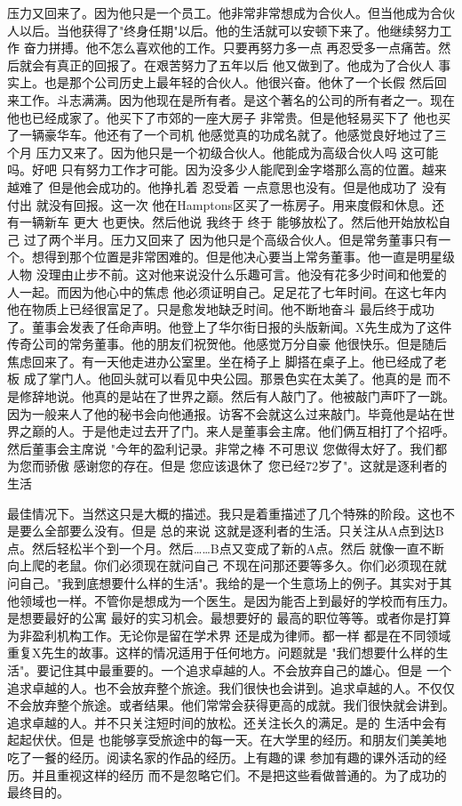 压力又回来了。因为他只是一个员工。他非常非常想成为合伙人。但当他成为合伙人以后。当他获得了"终身任期"以后。他的生活就可以安顿下来了。他继续努力工作 奋力拼搏。他不怎么喜欢他的工作。只要再努力多一点 再忍受多一点痛苦。然后就会有真正的回报了。在艰苦努力了五年以后 他又做到了。他成为了合伙人 事实上。也是那个公司历史上最年轻的合伙人。他很兴奋。他休了一个长假 然后回来工作。斗志满满。因为他现在是所有者。是这个著名的公司的所有者之一。现在他也已经成家了。他买下了市郊的一座大房子 非常贵。但是他轻易买下了 他也买了一辆豪华车。他还有了一个司机 他感觉真的功成名就了。他感觉良好地过了三个月 压力又来了。因为他只是一个初级合伙人。他能成为高级合伙人吗 这可能吗。好吧 只有努力工作才可能。因为没多少人能爬到金字塔那么高的位置。越来越难了 但是他会成功的。他挣扎着 忍受着 一点意思也没有。但是他成功了 没有付出 就没有回报。这一次 他在Hamptons区买了一栋房子。用来度假和休息。还有一辆新车 更大 也更快。然后他说 我终于 终于 能够放松了。然后他开始放松自己 过了两个半月。压力又回来了 因为他只是个高级合伙人。但是常务董事只有一个。想得到那个位置是非常困难的。但是他决心要当上常务董事。他一直是明星级人物 没理由止步不前。这对他来说没什么乐趣可言。他没有花多少时间和他爱的人一起。而因为他心中的焦虑 他必须证明自己。足足花了七年时间。在这七年内 他在物质上已经很富足了。只是愈发地缺乏时间。他不断地奋斗 最后终于成功了。董事会发表了任命声明。他登上了华尔街日报的头版新闻。X先生成为了这件传奇公司的常务董事。他的朋友们祝贺他。他感觉万分自豪 他很快乐。但是随后焦虑回来了。有一天他走进办公室里。坐在椅子上 脚搭在桌子上。他已经成了老板 成了掌门人。他回头就可以看见中央公园。那景色实在太美了。他真的是 而不是修辞地说。他真的是站在了世界之巅。然后有人敲门了。他被敲门声吓了一跳。因为一般来人了他的秘书会向他通报。访客不会就这么过来敲门。毕竟他是站在世界之巅的人。于是他走过去开了门。来人是董事会主席。他们俩互相打了个招呼。然后董事会主席说 "今年的盈利记录。非常之棒 不可思议 您做得太好了。我们都为您而骄傲 感谢您的存在。但是 您应该退休了 您已经72岁了"。这就是逐利者的生活 

最佳情况下。当然这只是大概的描述。我只是着重描述了几个特殊的阶段。这也不是要么全部要么没有。但是 总的来说 这就是逐利者的生活。只关注从A点到达B点。然后轻松半个到一个月。然后……B点又变成了新的A点。然后 就像一直不断向上爬的老鼠。你们必须现在就问自己 不现在问那还要等多久。你们必须现在就问自己。"我到底想要什么样的生活"。我给的是一个生意场上的例子。其实对于其他领域也一样。不管你是想成为一个医生。是因为能否上到最好的学校而有压力。是想要最好的公寓 最好的实习机会。最想要好的 最高的职位等等。或者你是打算为非盈利机构工作。无论你是留在学术界 还是成为律师。都一样 都是在不同领域重复X先生的故事。这样的情况适用于任何地方。问题就是 "我们想要什么样的生活"。要记住其中最重要的。一个追求卓越的人。不会放弃自己的雄心。但是 一个追求卓越的人。也不会放弃整个旅途。我们很快也会讲到。追求卓越的人。不仅仅不会放弃整个旅途。或者结果。他们常常会获得更高的成就。我们很快就会讲到。追求卓越的人。并不只关注短时间的放松。还关注长久的满足。是的 生活中会有起起伏伏。但是 也能够享受旅途中的每一天。在大学里的经历。和朋友们美美地吃了一餐的经历。阅读名家的作品的经历。上有趣的课 参加有趣的课外活动的经历。并且重视这样的经历 而不是忽略它们。不是把这些看做普通的。为了成功的最终目的。 

